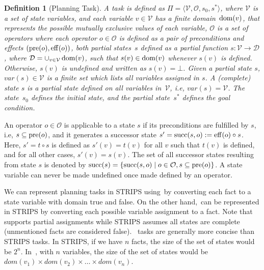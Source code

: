 \documentclass[ppgc,diss,english]{iiufrgs}
\newtheorem{definition}{Definition}
\begin{document}
\begin{definition}[\sas Planning Task]\label{def:sas}
A \sas task is defined as $\Pi=\langle\mathcal{V},\mathcal{O},s_0,s^*\rangle$, where $\mathcal{V}$ is a set of state variables, and each variable $v\in \mathcal{V}$ has a finite domain~$\operatorname{dom}(v)$, that represents the possible mutually exclusive values of each variable, $\mathcal{O}$ is a set of operators where each operator $o \in \mathcal{O}$ is defined as a pair of preconditions and effects $(\operatorname{pre}(o),\operatorname{eff}(o))$, both partial states~$s$ defined as a partial function $s:\mathcal{V}\rightarrow \mathcal{D}$, where $\mathcal{D}=\cup_{v\in \mathcal{V}}\operatorname{dom}(v)$, such that $s(v)\in \operatorname{dom}(v)$ whenever $s(v)$ is defined. Otherwise, $s(v)$ is undefined and written as $s(v)=\bot$. Given a partial state $s$, $var(s) \in \mathcal{V}$ is a finite set which lists all variables assigned in $s$. A (complete) state $s$ is a partial state defined on all variables in~$\mathcal{V}$, i.e, $var(s) = \mathcal{V}$. The state~$s_0$ defines the initial state, and the partial state~$s^*$ defines the goal condition.
\end{definition}

An operator $o \in \mathcal{O}$ is applicable to a state $s$ if its preconditions are fulfilled by $s$, i.e, $s \subseteq \operatorname{pre}(o)$, and it generates a successor state $s'=\operatorname{succ}(s,o):=\operatorname{eff}(o)\circ s$. Here, $s'=t\circ s$ is defined as $s'(v)=t(v)$ for all $v$ such that $t(v)$ is defined, and for all other cases, $s'(v)=s(v)$. The set of all successor states resulting from state $s$ is denoted by $\operatorname{succ}(s)=\{{\operatorname{succ}(s,o)\mid o\in \mathcal{O}, s \subseteq \operatorname{pre}(o)}\}$. A state variable can never be made undefined once made defined by an operator.

We can represent planning tasks in STRIPS using~\sas by converting each fact to a state variable with domain true and false. On the other hand,~\sas can be represented in STRIPS by converting each possible variable assignment to a fact. Note that \sas supports partial assignments while STRIPS assumes all states are complete (unmentioned facts are considered false).
~\sas tasks are generally more concise than STRIPS tasks. In STRIPS, if we have $n$ facts, the size of the set of states would be $2^n$. In~\sas, with $n$ variables, the size of the set of states would be $dom(v_{1}) \times dom(v_{2}) \times \ldots \times dom(v_{n})$.

\end{document}
